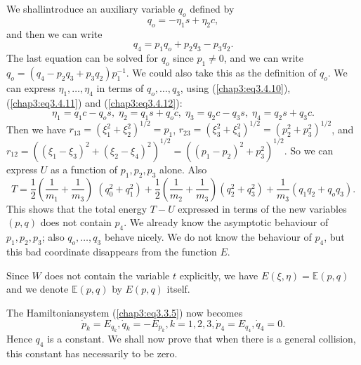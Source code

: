 We shall\pageoriginale introduce an auxiliary variable $q_o$ defined
by 
\begin{equation*}
q_o = -\eta_1 s + \eta_2 c, \tag{3.4.11}\label{chap3:eq3.4.11}
\end{equation*}
and then we can write 
\begin{equation*}
q_4 = p_1 q_o + p_2 q_3 - p_3 q_2. \tag{3.4.12}\label{chap3:eq3.4.12}
\end{equation*}
The last equation can be solved for $q_o$ since $p_1 \neq 0$, and we
can write $q_o = (q_4 - p_2 q_3 + p_3 q_2) p^{-1}_1$. We could also
take this as the definition of $q_o$. We can express $\eta_1, \ldots,
\eta_4$ in terms of $q_o, \ldots, q_3$, using (\ref{chap3:eq3.4.10}),
(\ref{chap3:eq3.4.11})  and (\ref{chap3:eq3.4.12}): 
\begin{equation*}
\eta_1 = q_1 c - q_o s, \; \eta_2 = q_1 s + q_o c, \; \eta_3 = q_2 c -
q_3 s, \; \eta_4 = q_2 s + q_3 c. \tag{3.4.13}\label{chap3:eq3.4.13} 
\end{equation*}
Then we have $r_{13} = (\xi^2_1 + \xi^2_2)^{1/2} = p_1$, $r_{23} =
(\xi^2_3 + \xi^2_4)^{1/2} = (p^2_2 + p^2_3)^{1/2}$, and $r_{12} =
((\xi_1 - \xi_3)^2 + (\xi_2 - \xi_4)^2)^{1/2} = ((p_1 - p_2)^2 +
p^2_3)^{1/2}$. So we can express $U$ as a function of $p_1, p_2, p_3$
alone. Also 
{\fontsize{10}{12}\selectfont
$$
T = \frac{1}{2} \left(\frac{1}{m_1} + \frac{1}{m_3} \right) \;
\left(q^2_0 + q^2_1 \right) + \frac{1}{2} \left(\frac{1}{m_2} +
\frac{1}{m_3} \right) \left(q^2_2 + q^2_3 \right) + \frac{1}{m_3}
\left(q_1 q_2 + q_o q_3 \right).  
$$}
This shows that the total energy $T - U$ expressed in terms of the new
variables $(p,q)$ does not contain $p_4$. We already know the
asymptotic behaviour of $p_1, p_2, p_3$; also $q_o , \ldots, q_3$
behave nicely. We do not know the behaviour of $p_4$, but this bad
coordinate disappears from the function $E$. 

Since $W$ does not contain the variable $t$ explicitly, we have
$E(\xi, \eta) = \mathbb{E} (p,q)$ and we denote $\mathbb{E}(p,q)$ by
$E(p,q)$ itself. 

The Hamiltonian\pageoriginale system (\ref{chap3:eq3.3.5}) now becomes 
\begin{equation*}
\dot{p}_k = E_{q_k}, \dot{q}_k = - E_{p_k}, k = 1,2,3, \dot{p}_4 =
E_{q_4} , \dot{q}_4 = 0. \tag{3.4.14}\label{chap3:eq3.4.14} 
\end{equation*}
Hence $q_4$ is a constant. We shall now prove that when there is a
general collision, this constant has necessarily to be zero. 

